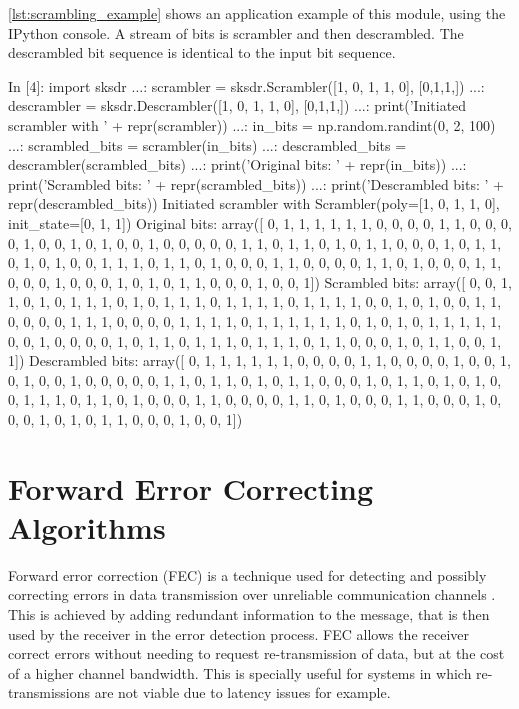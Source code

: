 \autoref{lst:scrambling_example} shows an application example of this module, using the IPython console. A stream of bits is scrambler and then descrambled. The descrambled bit sequence is identical to the input bit sequence.
\begin{python}[label={lst:scrambling_example},caption={Scrambling and Descrambling example}]
  In [4]: import sksdr
  ...: scrambler = sksdr.Scrambler([1, 0, 1, 1, 0], [0,1,1,])
  ...: descrambler = sksdr.Descrambler([1, 0, 1, 1, 0], [0,1,1,])
  ...: print('Initiated scrambler with ' + repr(scrambler))
  ...: in_bits = np.random.randint(0, 2, 100)
  ...: scrambled_bits = scrambler(in_bits)
  ...: descrambled_bits = descrambler(scrambled_bits)
  ...: print('Original bits: ' + repr(in_bits))
  ...: print('Scrambled bits: ' + repr(scrambled_bits))
  ...: print('Descrambled bits: ' + repr(descrambled_bits))
Initiated scrambler with Scrambler(poly=[1, 0, 1, 1, 0], init_state=[0, 1, 1])
Original bits: array([
      0, 1, 1, 1, 1, 1, 1, 0, 0, 0, 0, 1, 1, 0, 0, 0, 0, 1, 0, 0, 1, 0,
      1, 0, 0, 1, 0, 0, 0, 0, 0, 1, 1, 0, 1, 1, 0, 1, 0, 1, 1, 0, 0, 0,
      1, 0, 1, 1, 0, 1, 0, 1, 0, 0, 1, 1, 1, 0, 1, 1, 0, 1, 0, 0, 0, 1,
      1, 0, 0, 0, 0, 1, 1, 0, 1, 0, 0, 0, 1, 1, 0, 0, 0, 1, 0, 0, 0, 1,
      0, 1, 0, 1, 1, 0, 0, 0, 1, 0, 0, 1])
Scrambled bits: array([
      0, 0, 1, 1, 0, 1, 0, 1, 1, 1, 0, 1, 0, 1, 1, 1, 0, 1, 1, 1, 1, 0,
      1, 1, 1, 1, 0, 0, 1, 0, 1, 0, 0, 1, 1, 0, 0, 0, 0, 1, 1, 1, 0, 0,
      0, 0, 1, 1, 1, 1, 0, 1, 1, 1, 1, 1, 1, 0, 1, 0, 1, 0, 1, 1, 1, 1,
      1, 0, 0, 1, 0, 0, 0, 0, 1, 0, 1, 1, 0, 1, 1, 1, 0, 1, 1, 1, 0, 1,
      1, 0, 0, 0, 1, 0, 1, 1, 0, 0, 1, 1])
Descrambled bits: array([
      0, 1, 1, 1, 1, 1, 1, 0, 0, 0, 0, 1, 1, 0, 0, 0, 0, 1, 0, 0, 1, 0,
      1, 0, 0, 1, 0, 0, 0, 0, 0, 1, 1, 0, 1, 1, 0, 1, 0, 1, 1, 0, 0, 0,
      1, 0, 1, 1, 0, 1, 0, 1, 0, 0, 1, 1, 1, 0, 1, 1, 0, 1, 0, 0, 0, 1,
      1, 0, 0, 0, 0, 1, 1, 0, 1, 0, 0, 0, 1, 1, 0, 0, 0, 1, 0, 0, 0, 1,
      0, 1, 0, 1, 1, 0, 0, 0, 1, 0, 0, 1])
\end{python}

\section{Forward Error Correcting Algorithms}
Forward error correction (FEC) is a technique used for detecting and possibly correcting errors in data transmission over unreliable communication channels \cite{wikipedia_fec}. This is achieved by adding redundant information to the message, that is then used by the receiver in the error detection process. FEC allows the receiver correct errors without needing to request re-transmission of data, but at the cost of a higher channel bandwidth. This is specially useful for systems in which re-transmissions are not viable due to latency issues for example.

